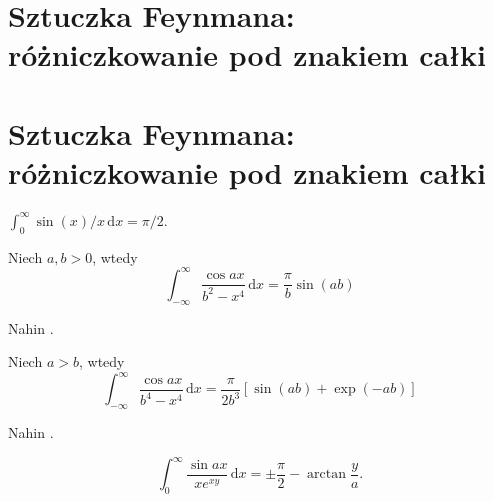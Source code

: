 %

\section{Sztuczka Feynmana: różniczkowanie pod znakiem całki}
\section{Sztuczka Feynmana: różniczkowanie pod znakiem całki} %

\begin{problem}
    $\int_0^\infty \sin(x) / x \,\mathrm{d}x = \pi/2$.
\end{problem}


\begin{problem}
    \label{nahin_holzweg}%
    Niech $a, b > 0$, wtedy
    \begin{equation}
        \int_{-\infty}^\infty \frac{\cos ax}{b^2 - x^4} \,\mathrm{d} x = \frac{\pi}{b} \sin (ab)
    \end{equation}
\end{problem}

\begin{solution} %
    Nahin \cite[s. 115, 375, 376]{nahin15}. %
\end{solution} %

\begin{problem}
    \label{nahin_datenautobahn}%
    Niech $a > b$, wtedy
    \begin{equation}
        \int_{-\infty}^\infty \frac{\cos ax}{b^4 - x^4} \,\mathrm{d} x = \frac{\pi}{2b^3} [\sin (ab) + \exp (-ab)]
    \end{equation}
\end{problem}

\begin{solution} %
    Nahin \cite[s. 115, 376]{nahin15}. %
\end{solution} %

\begin{problem}
    \begin{equation}
        \int_0^\infty \frac{\sin ax}{x e^{xy}} \,\mathrm{d}x = \pm \frac \pi 2 - \arctan \frac y a.
    \end{equation}
\end{problem}


